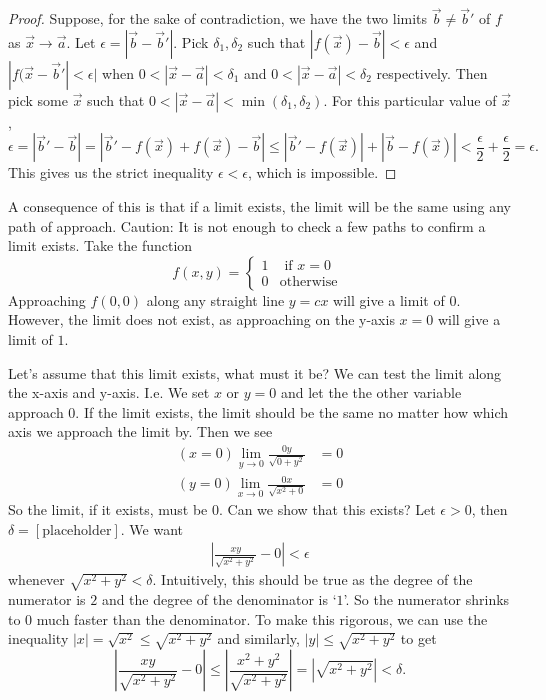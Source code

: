\begin{proof}
    Suppose, for the sake of contradiction, we have the two limits $\vec{b}\neq\vec{b}'$ of $f$ as $\vec{x}\to\vec{a}$. Let $\epsilon=|\vec{b}-\vec{b}'|$. Pick $\delta_1,\delta_2$ such that $|f(\vec{x})-\vec{b}|<\epsilon$ and $|f(\vec{x}-\vec{b}'|<\epsilon|$ when $0<|\vec{x}-\vec{a}|<\delta_1$ and $0<|\vec{x}-\vec{a}|<\delta_2$ respectively. Then pick some $\vec{x}$ such that $0<|\vec{x}-\vec{a}|<\min(\delta_1,\delta_2)$. For this particular value of $\vec{x}$,\[
        \epsilon=|\vec{b}'-\vec{b}|= |\vec{b}'-f(\vec{x})+f(\vec{x})-\vec{b}|\leq|\vec{b}'-f(\vec{x})|+|\vec{b}-f(\vec{x})| <\frac{\epsilon}{2}+\frac{\epsilon}{2}=\epsilon.
    \]
    This gives us the strict inequality $\epsilon<\epsilon$, which is impossible.
\end{proof}
\begin{remark}
    A consequence of this is that if a limit exists, the limit will be the same using any path of approach. Caution: It is not enough to check a few paths to confirm a limit exists. Take the function \[
        f(x,y)=\begin{cases}
            1 &\textrm { if } x=0\\
            0 &\textrm{otherwise }
        \end{cases}
    \]
    Approaching $f(0,0)$ along any straight line $y=cx$ will give a limit of $0$. However, the limit does not exist, as approaching on the y-axis $x=0$ will give a limit of $1$. 
\end{remark}
Let's assume that this limit exists, what must it be? We can test the limit along the x-axis and y-axis. I.e. We set $x$ or $y=0$ and let the the other variable approach $0$. If the limit exists, the limit should be the same no matter how which axis we approach the limit by. Then we see \begin{align*}
    (x=0) \lim_{y\to 0}\frac{0y}{\sqrt{0+y^2}}& =0 \\
    (y=0)\lim_{x\to 0}\frac{0x}{\sqrt{x^2+0}}&=0
\end{align*}
So the limit, if it exists, must be $0$.
Can we show that this exists? Let $\epsilon>0$, then $\delta=[\textrm{placeholder}]$. We want \begin{align*}
    \left|\frac{xy}{\sqrt{x^2+y^2}}-0\right|<\epsilon
\end{align*} whenever $\sqrt{x^2+y^2}<\delta$. Intuitively, this should be true as the degree of the numerator is $2$ and the degree of the denominator is `$1$'. So the numerator shrinks to $0$ much faster than the denominator. To make this rigorous, we can use the inequality $|x|=\sqrt{x^2}\leq \sqrt{x^2+y^2}$ and similarly, $|y|\leq \sqrt{x^2+y^2}$ to get \[
    \left|\frac{xy}{\sqrt{x^2+y^2}}-0\right|\leq\left|\frac{x^2+y^2}{\sqrt{x^2+y^2}}\right|
    =\left|\sqrt{x^2+y^2}\right|<\delta.
\]
